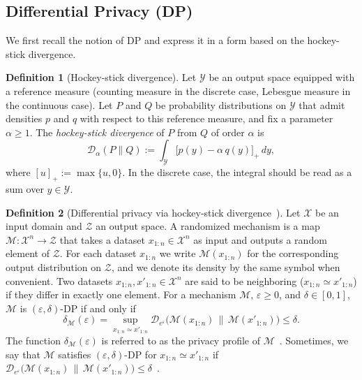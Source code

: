 \documentclass{article}
\theoremstyle{plain}
\theoremstyle{definition}
\newtheorem{definition}{Definition}[section]
\begin{document}
\subsection{Differential Privacy (DP)}

We first recall the notion of DP and express it in a form based on the hockey-stick divergence.

\begin{definition}[Hockey-stick divergence]
Let $\mathcal Y$ be an output space equipped with a reference measure
(counting measure in the discrete case, Lebesgue measure in the continuous
case).
Let $P$ and $Q$ be probability distributions on $\mathcal Y$ that admit
densities $p$ and $q$ with respect to this reference measure, and fix a
parameter $\alpha \ge 1$.
The \emph{hockey-stick divergence} of $P$ from $Q$ of order $\alpha$ is 
\[
  \mathcal D_{\alpha}(P\|Q)
  :=
  \int_{\mathcal Y} \bigl[p(y) - \alpha\,q(y)\bigr]_+\,dy,
\]
where $[u]_+ := \max\{u,0\}$.
In the discrete case, the integral should be read as a sum over
$y\in\mathcal Y$.
\end{definition}

\begin{definition}[Differential privacy via hockey-stick divergence~\cite{dworkAlgorithmicFoundationsDifferential2013a, bartheDifferentialPrivacyComposition2013}]
Let $\mathcal X$ be an input domain and $\mathcal Z$ an output space.
A randomized mechanism is a map
$
  \mathcal M : \mathcal X^n \to \mathcal Z
$
that takes a dataset $x_{1:n}\in\mathcal X^n$ as input and outputs a
random element of $\mathcal Z$.
For each dataset $x_{1:n}$ we write $\mathcal M(x_{1:n})$ for the
corresponding output distribution on $\mathcal Z$, and we denote its
density by the same symbol when convenient.
Two datasets $x_{1:n},x'_{1:n}\in\mathcal X^n$ are said to be neighboring ($x_{1:n}\simeq x'_{1:n}$) if they differ in exactly one element. For a mechanism $\mathcal M$, $\varepsilon\ge0$, and $\delta\in [0,1]$, $\mathcal M$ is $(\varepsilon,\delta)$-DP if and only if
\[
  \delta_\mathcal{M}(\varepsilon) = \sup_{x_{1:n}\simeq x'_{1:n}}
  \mathcal D_{e^\varepsilon}\bigl(\mathcal M(x_{1:n}) \,\big\|\, \mathcal M(x'_{1:n})\bigr)\le\delta.
\]
The function $\delta_\mathcal{M}(\varepsilon)$ is referred to as the privacy profile of $\mathcal M$~\cite{ballePrivacyAmplificationSubsampling2018a}.
Sometimes, we say that $\mathcal M$ satisfies $(\varepsilon,\delta)$-DP for $x_{1:n}\simeq x'_{1:n}$ if $\mathcal D_{e^\varepsilon}\bigl(\mathcal M(x_{1:n}) \,\big\|\, \mathcal M(x'_{1:n})\bigr)\le\delta$~\cite{sommerPrivacyLossClasses2019}.
\end{definition}
\end{document}
